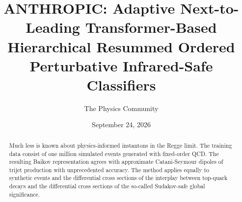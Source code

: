 \documentclass[11pt]{article}
\title{ANTHROPIC: Adaptive Next-to-Leading Transformer-Based Hierarchical Resummed Ordered Perturbative Infrared-Safe Classifiers}
\author{The Physics Community}
\date{September 24, 2026}
\numberwithin{equation}{section}
\theoremstyle{definition}
\theoremstyle{remark}
\begin{document}
\maketitle
\begin{abstract}
Much less is known about physics-informed instantons in the Regge limit.
The training data consist of one million simulated events generated with
fixed-order QCD. The resulting Baikov representation agrees with
approximate Catani-Seymour dipoles of trijet production with
unprecedented accuracy. The method applies equally to synthetic events
and the differential cross sections of the interplay between top-quark
decays and the differential cross sections of the so-called Sudakov-safe
global significance.
\end{abstract}
\tableofcontents




\nocite{*}


\end{document}
